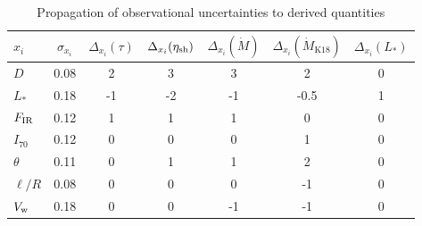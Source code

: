 \begin{table}
  \centering
  \caption[Derived]{Propagation of observational uncertainties to derived quantities}
  \label{tab:derived-parameters}
  \setlength\tabcolsep{3pt}
  \begin{tabular}{l S S S S S S}
    \toprule
    \(x_i\) & {\(\sigma_{x_i}\)}
    & {\(\Delta_{x_i} (\tau)\)} & {\(\Delta_{x_i} (\eta_{\text{sh}})\)}
    & {\(\Delta_{x_i} (\dot M)\)} & {\(\Delta_{x_i} (\dot M_{\text{K18}})\)}
    & {\(\Delta_{x_i} (L_*)\)}
    \\
    \midrule
    \(D\)     & 0.08 & 2  & 3 & 3 & 2 & 0\\
    \(L_*\)   & 0.18 & -1 & -2 & -1 & -0.5 & 1\\
    \(F_{\text{IR}}\)  & 0.12 & 1 & 1 & 1 & 0 & 0\\
    \(I_{70}\) & 0.12 & 0 & 0 & 0 & 1 & 0\\
    \(\theta\) & 0.11 & 0 & 1 & 1 & 2 & 0\\
    \(\ell/R\) & 0.08 & 0 & 0 & 0 & -1 & 0\\
    \(V_{\text{w}}\) & 0.18 & 0 & 0 & -1 & -1 & 0\\
    \bottomrule
  \end{tabular}
\end{table}



